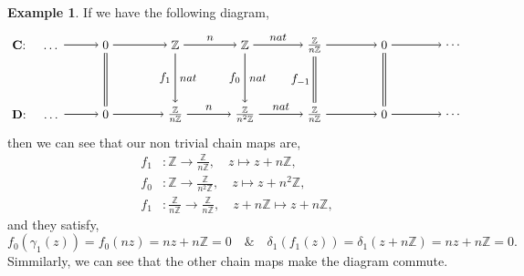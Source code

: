 \documentclass[11.5pt, twoside, a4paper, titlepage]{report}
\providecommand{\equ}[0]{\begin{equation*}}
\providecommand{\eequ}[0] {\end{equation*}}
\providecommand{\bb}[1]{\mathbb{#1}}
\theoremstyle{definition}
\newtheorem{eg}[mydef]{Example}
\theoremstyle{plain}
\begin{document}
\begin{eg}
If we have the following diagram,
\equ
\begin{tikzpicture}[->,-latex, auto, main path/.style={->, semithick}, main node/.style={}]
\node	[main node]		(1) at (0,0)		{$\mathbf{C}$: \quad \dots};
\node	[main node]		(2) at (2,0)		{$0$};
\node	[main node]		(3) at (4,0)		{$\bb{Z}$};
\node [main node]		(4) at (6,0)		{$\bb{Z}$};
\node [main node]		(5) at (8,0)		{$\frac{\bb{Z}}{n\bb{Z}}$};
\node	[main node]		(11) at (10,0)	{$0$};
\node [main node] 		(12) at (12,0)	{\dots};
\node	[main node]		(6) at (0,-2)		{$\mathbf{D}$: \quad \dots};
\node	[main node]		(7) at (2,-2)		{$0$};
\node	[main node]		(8) at (4,-2)		{$\frac{\bb{Z}}{n\bb{Z}}$};
\node [main node]		(9) at (6,-2)		{$\frac{\bb{Z}}{n^2\bb{Z}}$};
\node [main node]		(10) at (8,-2)	{$\frac{\bb{Z}}{n\bb{Z}}$};
\node [main node]		(13) at (10,-2)	{$0$};
\node [main node]		(14) at (12,-2)	{\dots};

\draw (1) edge [main path] node [auto] {$$} (2);
\draw (2) edge [main path] node [auto] {$$} (3);
\draw (3) edge [main path] node [auto] {\small $n$} (4);
\draw (4) edge [main path] node [auto] {\small $nat$} (5);
\draw (5) edge [main path] (11);
\draw (11) edge [main path] (12);
\draw (6) edge [main path] node [auto] {$$} (7);
\draw (7) edge [main path] node [auto] {$$} (8);
\draw (8) edge [main path] node [auto] {\small $n$} (9);
\draw (9) edge [main path] node [auto] {\small $nat$} (10);
\draw (10) edge [main path] (13);
\draw (13) edge [main path] (14);
\draw (3) edge [main path] node [auto, swap] {$f_{1}$} node [auto] {\small $nat$} (8);
\draw (4) edge [main path] node [auto, swap] {$f_{0}$} node [auto] {\small $nat$} (9);
\draw (5) edge [-, semithick, double, double distance=1.5pt] node [auto, swap] {$f_{-1}$} (10);
\draw (11) edge [-, semithick, double, double distance=1.5pt] (13);
\draw (2) edge [-, semithick, double, double distance=1.5pt] (7);
\end{tikzpicture}
\eequ
then we can see that our non trivial chain maps are, 
\begin{align*}
f_{1} &: \bb{Z} \to \frac{\bb{Z}}{n\bb{Z}}, \quad z \mapsto z+n\bb{Z},\\
f_0 &: \bb{Z} \to \frac{\bb{Z}}{n^2\bb{Z}}, \quad z \mapsto z+n^2\bb{Z}, \\
f_{1} &: \frac{\bb{Z}}{n\bb{Z}} \to \frac{\bb{Z}}{n\bb{Z}}, \quad z+n\bb{Z} \mapsto z+n\bb{Z}, 
\end{align*}
and they satisfy, 
\equ
f_0(\gamma_1(z))=f_0(nz)=nz+n\bb{Z}=0\quad \& \quad \delta_1(f_1(z))=\delta_1(z+n\bb{Z})=nz+n\bb{Z}=0.
\eequ
Simmilarly, we can see that the other chain maps make the diagram commute.
\end{eg}
\end{document}
